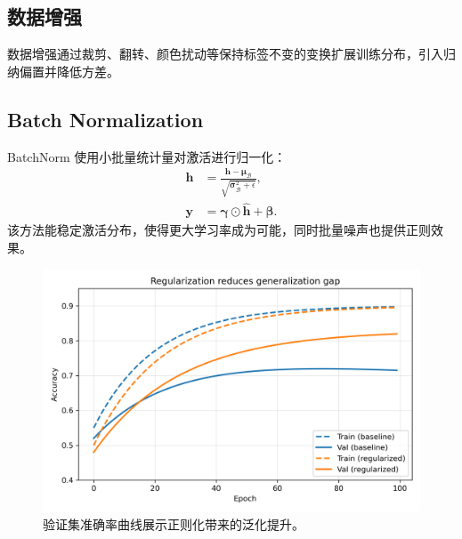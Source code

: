 ﻿\documentclass[UTF8,zihao=-4]{ctexart}
\begin{document}
\subsection{数据增强}
数据增强通过裁剪、翻转、颜色扰动等保持标签不变的变换扩展训练分布，引入归纳偏置并降低方差。

\subsection{Batch Normalization}
BatchNorm 使用小批量统计量对激活进行归一化：
\begin{align}
  \hat{\mathbf{h}} &= \frac{\mathbf{h} - \boldsymbol{\mu}_\mathcal{B}}{\sqrt{\boldsymbol{\sigma}_\mathcal{B}^2 + \epsilon}}, \\
  \mathbf{y} &= \boldsymbol{\gamma} \odot \hat{\mathbf{h}} + \boldsymbol{\beta}.
\end{align}
该方法能稳定激活分布，使得更大学习率成为可能，同时批量噪声也提供正则效果。

\begin{figure}[H]
  \centering
  \includegraphics[width=0.8\linewidth]{regularization_effects.png}
  \caption{验证集准确率曲线展示正则化带来的泛化提升。}
  \label{fig:regularization_effects_cn}
\end{figure}
\FloatBarrier
\end{document}
